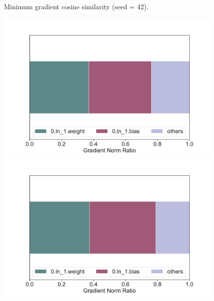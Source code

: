 \documentclass{article}
\begin{document}
\begin{figure}[H]
\begin{minipage}[b]{0.32\linewidth}
    \end{minipage}
    \caption{Minimum gradient cosine similarity (seed = 42).}
\end{figure}

\begin{figure}[H]
    \centering
    \begin{minipage}[b]{0.32\linewidth}
        \includegraphics[width=\linewidth]{figs/gradnorm_perparam_ratio_1_igpt_hopper_medium_42.pdf}
    \end{minipage}
    \begin{minipage}[b]{0.32\linewidth}
        \includegraphics[width=\linewidth]{figs/gradnorm_perparam_ratio_1_igpt_halfcheetah_medium_42.pdf}
    \end{minipage}
    \begin{minipage}[b]{0.32\linewidth}

\end{minipage}
\end{figure}
\end{document}
